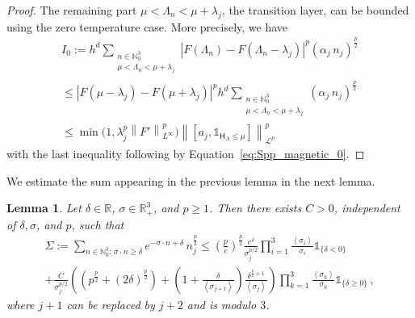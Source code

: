 \documentclass[11pt]{amsart}
\theoremstyle{plain}
\newtheorem{lem}[theorem]{Lemma}
\theoremstyle{definition}
\newcommand		{\N}		{\mathbb N}			%
\newcommand		{\RR}		{\mathbb R}			%
\newcommand		{\R}		{\RR}
\renewcommand	{\L}		{\mathcal L}		%
\newcommand		\sfH		{\mathsf H}			%
\newcommand		{\lt}			{\left}				%
\newcommand		{\rt}			{\right}			%
\renewcommand	{\(}			{\lt(}
\renewcommand	{\)}			{\rt)}
\newcommand		{\bangle}[1]	{\lt\langle #1\rt\rangle}
\newcommand		{\weight}[1]	{\bangle{#1}}	%
\newcommand		{\com}[1]		{\lt[{#1}\rt]}		%
\newcommand		{\n}[1]			{\lt\lvert #1 \rt\rvert}
\newcommand		{\nrm}[1]		{\lt\lVert #1\rt\rVert}
\newcommand		{\Nrm}[2]		{\nrm{#1}_{#2}}
\newcommand		{\indic}	{\mathds{1}}		%
\newcommand		{\hd}		{h^d}
\begin{document}
\begin{proof}
        The remaining part $\mu < \Lambda_n < \mu+\lambda_j$, the transition layer, can be bounded using the zero temperature case. More precisely, we have 
        \begin{multline*}
        	I_0:=\hd \sum_{\substack{n\in\N_0^3\\ \mu < \Lambda_n < \mu+\lambda_j}}\n{F(\Lambda_n) - F(\Lambda_n-\lambda_j)}^p (\alpha_j\, n_j)^\frac{p}{2}
            \\
            \leq \n{F(\mu-\lambda_j)-F(\mu+\lambda_j)}^p \hd \sum_{\substack{n\in\N_0^3\\ \mu < \Lambda_n < \mu+\lambda_j}} (\alpha_j\, n_j)^\frac{p}{2}
            \\
            \leq \min\bigl(1,\lambda_j^p \Nrm{F'}{L^\infty}^p\bigr) \Nrm{\com{a_j,\indic_{\sfH_A\leq \mu}}}{\L^p}^p
        \end{multline*}
        with the last inequality following by Equation~\eqref{eq:Spp_magnetic_0}.
    \end{proof}
    
	
	We estimate the sum appearing in the previous lemma in the next lemma.
	\begin{lem}
		Let $\delta\in\R$, $\sigma\in\R_+^3$, and $p\geq 1$. Then there exists $C>0$, independent of $\delta, \sigma$, and $p$, such that 
		\begin{multline*}
			\Sigma:=\sum_{n\in\N_0^3:\, \sigma\cdot n \geq \delta} e^{-\sigma\cdot n +\delta}\, n_j^\frac{p}{2} \le \lt(\frac{p}{e}\rt)^{\frac{p}{2}}\frac{e^\delta}{\sigma_j^{p/2}} \prod^3_{i=1} \frac{\weight{\sigma_i}}{\sigma_i}\indic_{\{\delta< 0\}}
            \\
            + \frac{C}{\sigma_j^{p/2}}
			\lt(\lt( p^\frac{p}{2} + \lt(2\delta\rt)^\frac{p}{2} \rt)
			+ \lt(1+\frac{\delta}{\weight{\sigma_{j+1}}}\rt) \frac{\delta^{\frac{p}{2}+1}}{\weight{\sigma_j}} \rt) \prod_{k=1}^3 \frac{\weight{\sigma_k}}{\sigma_k}\indic_{\{\delta\ge 0\}}\,,
		\end{multline*}
		where $j+1$ can be replaced by $j+2$ and is modulo $3$.
	\end{lem}
	
\end{document}
